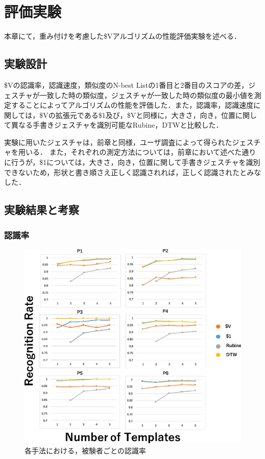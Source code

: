 \chapter{評価実験}
本章にて，重み付けを考慮した\$Vアルゴリズムの性能評価実験を述べる．

\section{実験設計}
\$Vの認識率，認識速度，類似度のN-best Listの1番目と2番目のスコアの差，ジェスチャが一致した時の類似度，ジェスチャが一致した時の類似度の最小値を測定することによってアルゴリズムの性能を評価した．また，認識率，認識速度に関しては，\$Vの拡張元である\$1及び，\$Vと同様に，大きさ，向き，位置に関して異なる手書きジェスチャを識別可能なRubine，DTWと比較した．

実験に用いたジェスチャは，前章と同様，ユーザ調査によって得られたジェスチャを用いる．
また，それぞれの測定方法については，前章において述べた通りに行うが，\$1については，大きさ，向き，位置に関して手書きジェスチャを識別できないため，形状と書き順さえ正しく認識されれば，正しく認識されたとみなした．

\section{実験結果と考察}
\subsection{認識率}
\begin{figure}[!h]
\centering
\includegraphics[width=1.0\columnwidth]{img/rec_rate.eps}
\caption{各手法における，被験者ごとの認識率}
\label{fig:rec_rate}
\end{figure}


